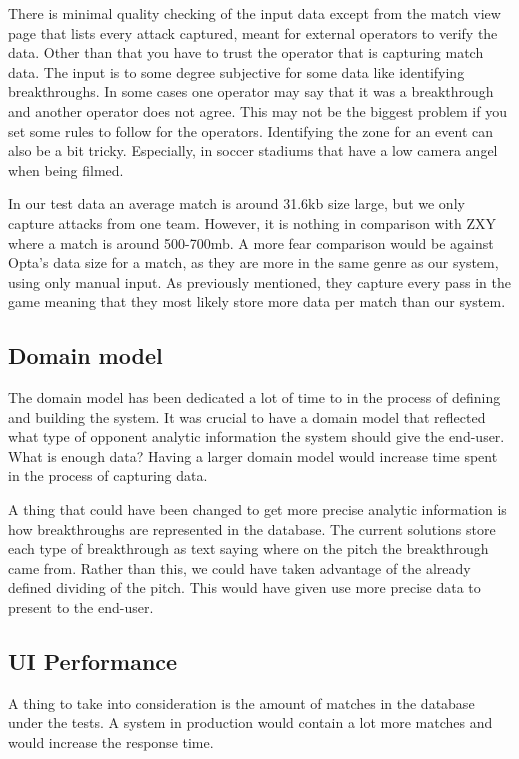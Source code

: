 There is minimal quality checking of the input data except from the match view page that lists every attack captured, meant for external operators to verify the data. Other than that you have to trust the operator that is capturing match data. The input is to some degree subjective for some data like identifying breakthroughs. In some cases one operator may say that it was a breakthrough and another operator does not agree. This may not be the biggest problem if you set some rules to follow for the operators. Identifying the zone for an event can also be a bit tricky. Especially, in soccer stadiums that have a low camera angel when being filmed. 

In our test data an average match is around 31.6kb size large, but we only capture attacks from one team. However, it is nothing in comparison with ZXY where a match is around 500-700mb. A more fear comparison would be against Opta’s data size for a match, as they are more in the same genre as our system, using only manual input. As previously mentioned, they capture every pass in the game meaning that they most likely store more data per match than our system. 

\subsection{Domain model}
The domain model has been dedicated a lot of time to in the process of defining and building the system. It was crucial to have a domain model that reflected what type of opponent analytic information the system should give the end-user. What is enough data? Having a larger domain model would increase time spent in the process of capturing data. 

A thing that could have been changed to get more precise analytic information is how breakthroughs are represented in the database. The current solutions store each type of breakthrough as text saying where on the pitch the breakthrough came from. Rather than this, we could have taken advantage of the already defined dividing of the pitch. This would have given use more precise data to present to the end-user.

\subsection{UI Performance}

A thing to take into consideration is the amount of matches in the database under the tests. A system in production would contain a lot more matches and would increase the response time. 

